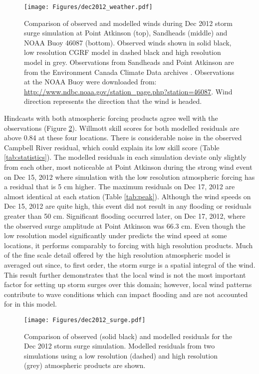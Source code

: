 \documentclass[letterpaper]{tATO2e}
\begin{document}
\begin{figure}
\centering
\texttt{[image: Figures/dec2012\_weather.pdf]}
\caption{{\color{red}Comparison of observed and modelled winds during Dec 2012 storm surge simulation at Point Atkinson (top), Sandheads (middle) and NOAA Buoy 46087 (bottom). Observed winds shown in solid black, low resolution CGRF model in dashed black and high resolution model in grey. Observations from Sandheads and Point Atkinson are from the Environment Canada Climate Data archives \citep{ECClimateArchive}.  Observations at the NOAA Buoy were downloaded from: \url{http://www.ndbc.noaa.gov/station_page.php?station=46087}. Wind direction represents the direction that the wind is headed.} }
\label{fig:dec2012_weather}
\end{figure}

Hindcasts with both atmospheric forcing products agree well with the observations (Figure \ref{fig:dec2012_surge}). Willmott skill scores for both modelled residuals are above {\color{red} 0.84} at these four locations. {\color{red} There is considerable noise in the observed Campbell River residual, which could explain its low skill score (Table \ref{tab:statistics}).} {\color{red} The modelled residuals in each simulation deviate only slightly from each other, most noticeable at Point Atkinson during the strong wind event on Dec 15, 2012 where simulation with the low resolution atmospheric forcing has a residual that is 5 cm higher.  The maximum residuals on Dec 17, 2012 are almost identical at each station (Table \ref{tab:peak}).} Although the wind speeds on Dec 15, 2012 are quite high, this event did not result in any flooding or residuals greater than 50 cm. Significant flooding occurred later, on Dec 17, 2012, where the observed surge amplitude at Point Atkinson was {\color{red}66.3 cm}. Even though the low resolution model significantly under predicts the wind speed at some locations, it performs comparably to forcing with high resolution products. Much of the fine scale detail offered by the high resolution atmospheric model is averaged out since, to first order, the storm surge is a spatial integral of the wind. This result further demonstrates that the local wind is not the most important factor for setting up storm surges over this domain; however, local wind patterns contribute to wave conditions which can impact flooding and are not accounted for in this model. 

\begin{figure}
\centering
\texttt{[image: Figures/dec2012\_surge.pdf]}
\caption{Comparison of observed (solid black) and modelled residuals for the Dec 2012 storm surge simulation. Modelled residuals from two simulations using a low resolution (dashed) and high resolution (grey) atmospheric products are shown. }
\label{fig:dec2012_surge}
\end{figure}
\end{document}
